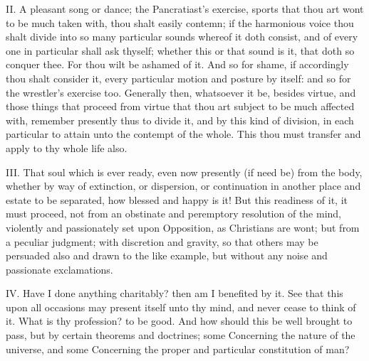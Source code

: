 II. A pleasant song or dance; the Pancratiast's exercise, sports that
thou art wont to be much taken with, thou shalt easily contemn; if the
harmonious voice thou shalt divide into so many particular sounds whereof
it doth consist, and of every one in particular shall ask thyself; whether
this or that sound is it, that doth so conquer thee. For thou wilt be
ashamed of it. And so for shame, if accordingly thou shalt consider it,
every particular motion and posture by itself: and so for the wrestler's
exercise too. Generally then, whatsoever it be, besides virtue, and those
things that proceed from virtue that thou art subject to be much affected
with, remember presently thus to divide it, and by this kind of division,
in each particular to attain unto the contempt of the whole. This thou
must transfer and apply to thy whole life also.

III. That soul which is ever ready, even now presently (if need be) from
the body, whether by way of extinction, or dispersion, or continuation in
another place and estate to be separated, how blessed and happy is it! But
this readiness of it, it must proceed, not from an obstinate and
peremptory resolution of the mind, violently and passionately set upon
Opposition, as Christians are wont; but from a peculiar judgment; with
discretion and gravity, so that others may be persuaded also and drawn to
the like example, but without any noise and passionate exclamations.

IV. Have I done anything charitably? then am I benefited by it. See
that this upon all occasions may present itself unto thy mind, and never
cease to think of it. What is thy profession? to be good. And how should
this be well brought to pass, but by certain theorems and doctrines; some
Concerning the nature of the universe, and some Concerning the proper and
particular constitution of man?


